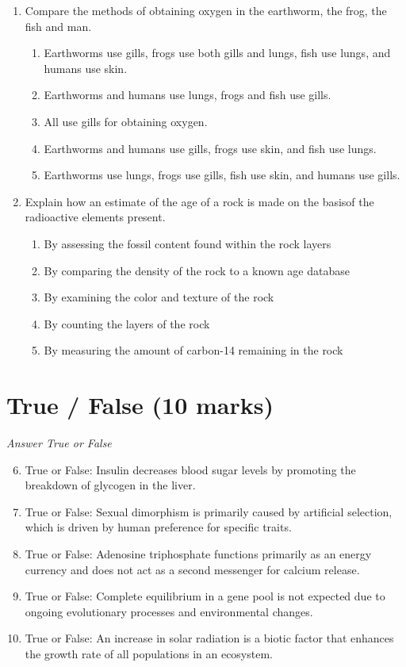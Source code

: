 \documentclass[12pt]{article}
\begin{document}
\begin{enumerate}[label=\arabic*.]
\begin{enumerate}[label=(\alph*)]
    \item fish, frog
\end{enumerate}
\item Compare the methods of obtaining oxygen in the earthworm, the frog, the fish and man.
\begin{enumerate}[label=(\alph*)]
    \item Earthworms use gills, frogs use both gills and lungs, fish use lungs, and humans use skin.
    \item Earthworms and humans use lungs, frogs and fish use gills.
    \item All use gills for obtaining oxygen.
    \item Earthworms and humans use gills, frogs use skin, and fish use lungs.
    \item Earthworms use lungs, frogs use gills, fish use skin, and humans use gills.
\end{enumerate}
\item Explain how an estimate of the age of a rock is made on the basisof the radioactive elements present.
\begin{enumerate}[label=(\alph*)]
    \item By assessing the fossil content found within the rock layers
    \item By comparing the density of the rock to a known age database
    \item By examining the color and texture of the rock
    \item By counting the layers of the rock
    \item By measuring the amount of carbon-14 remaining in the rock
\end{enumerate}
\end{enumerate}

\section*{True / False (10 marks)}
\textit{Answer True or False}
\begin{enumerate}[label=\arabic*.]
\setcounter{enumi}{5}
\item True or False: Insulin decreases blood sugar levels by promoting the breakdown of glycogen in the liver.
\item True or False: Sexual dimorphism is primarily caused by artificial selection, which is driven by human preference for specific traits.
\item True or False: Adenosine triphosphate functions primarily as an energy currency and does not act as a second messenger for calcium release.
\item True or False: Complete equilibrium in a gene pool is not expected due to ongoing evolutionary processes and environmental changes.
\item True or False: An increase in solar radiation is a biotic factor that enhances the growth rate of all populations in an ecosystem.
\end{enumerate}
\end{document}
